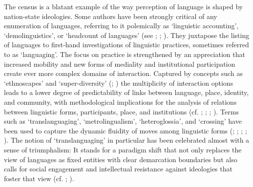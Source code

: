 \documentclass[output=paper]{langscibook}
\begin{document}
The census is a blatant example of the way perception of language is shaped by nation-state ideologies. Some authors have been strongly critical of any enumeration of languages, referring to it polemically as ‘linguistic accounting’, ‘demolinguistics’, or ‘headcount of languages’ (see \citealt[19–49]{pennycook_metrolingualism_2015}; \citealt[187–188]{king_multilingual_2016}; \citealt[56–64]{stevenson_language_2017}). They juxtapose the listing of languages to first-hand investigations of linguistic practices, sometimes referred to as ‘languaging’. The focus on practice is strengthened by an appreciation that increased mobility and new forms of mediality and institutional participation create ever more complex domains of interaction. Captured by concepts such as ‘ethnoscapes’ and ‘super-diversity’ (\citealt{appadurai_global_1992}; \citealt{vertovec_super-diversity_2007}) the multiplicity of interaction options leads to a lower degree of predictability of links between language, place, identity, and community, with methodological implications for the analysis of relations between linguistic forms, participants, place, and institutions (cf. \citealt{blommaert_sociolinguistics_2010}; \citealt{blommaert_language_2011}; \citealt{arnaut_language_2016}; \citealt{arnaut_engaging_2017}). Terms such as ‘translanguaging’, ‘metrolingualism’, ‘heteroglossia’, and ‘crossing’ have been used to capture the dynamic fluidity of moves among linguistic forms (\citealt{rampton_crossing_1995}; \citealt{blackledge_multilingualism_2010}; \citealt{garcia_translanguaging_2014}; \citealt{pennycook_metrolingualism_2015}; \citealt{wei_translanguaging_2018}). The notion of ‘translanguaging’ in particular has been celebrated almost with a sense of triumphalism: It stands for a paradigm shift that not only replaces the view of languages as fixed entities with clear demarcation boundaries but also calls for social engagement and intellectual resistance against ideologies that foster that view (cf. \citealt{creese_routledge_2018}; \citealt{moore_translanguaging_2020}).
\end{document}
